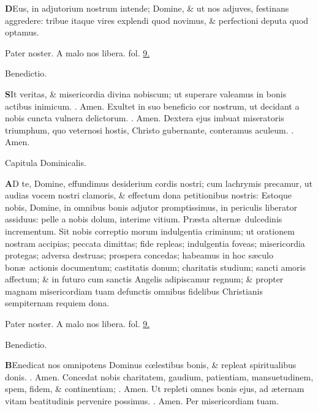 \documentclass[letter,11pt]{book}
\makeatletter
\DeclareRobustCommand{\Rbar}{\vers@resp{0pt}{R}}
\newcommand{\vers@resp@sym}{\raisebox{0.2ex}{\rotatebox[origin=c]{-20}{$\m@th\rceil$}}}
\newcommand{\vers@resp}[2]{%
  {\ooalign{\hidewidth\kern#1\vers@resp@sym\hidewidth\cr#2\cr}}%
}%
\def\R{\color{Red} \Rbar . \color{black}}
\makeatother
\begin{document}
\begin{multicols*}{2}
\lettrine[lines=2]{\bfseries \color{Red} D}{}Eus, in adjutorium nostrum intende; Domine, \& ut nos adjuves, festinans aggredere: tribue itaque vires explendi quod novimus, \& perfectioni deputa quod optamus.
\par Pater noster.
\newline A malo nos libera. \color{Red} fol. \color{black} \hyperlink{page.9}{9.}
\vspace{-.5em} \begin{center} \color{Red} Benedictio. \end{center} \vspace{-.5em}
\lettrine[lines=2]{\bfseries \color{Red} S}{}It veritas, \& misericordia divina nobiscum; ut superare valeamus in bonis actibus inimicum. \R Amen. Exultet in suo beneficio cor nostrum, ut decidant a nobis cuncta vulnera delictorum. \R Amen. Dextera ejus imbuat miseratoris triumphum, quo veternosi hostis, Christo gubernante, conteramus aculeum. \R Amen.
\vspace{-.5em} \begin{center} \color{Red} Capitula Dominicalis. \end{center} \vspace{-.5em}
\lettrine[lines=2]{\bfseries \color{Red} A}{}D te, Domine, effundimus desiderium cordis nostri; cum lachrymis precamur, ut audias vocem nostri clamoris, \& effectum dona petitionibus nostris: Estoque nobis, Domine, in omnibus bonis adjutor promptissimus, in periculis liberator assiduus: pelle a nobis dolum, interime vitium. Pr\ae sta altern\ae \ dulcedinis incrementum. Sit nobis correptio morum indulgentia criminum; ut orationem nostram accipias; peccata dimittas; fide repleas; indulgentia foveas; misericordia protegas; adversa destruas; prospera concedas; habeamus in hoc s\ae culo bon\ae \ actionis documentum; castitatis donum; charitatis studium; sancti amoris affectum; \& in futuro cum sanctis Angelis adipiscamur regnum; \& propter magnam misericordiam tuam defunctis omnibus fidelibus Christianis sempiternam requiem dona.
\par Pater noster.
\newline A malo nos libera. \color{Red} fol. \color{black} \hyperlink{page.9}{9.}
\vspace{-.5em} \begin{center} \color{Red} Benedictio. \end{center} \vspace{-.5em}
\lettrine[lines=2]{\bfseries \color{Red} B}{}Enedicat nos omnipotens Dominus c\oe lestibus bonis, \& repleat spiritualibus donis. \R Amen. Concedat nobis charitatem, gaudium, patientiam, mansuetudinem, spem, fidem, \& continentiam; \R Amen. Ut repleti omnes bonis ejus, ad \ae ternam vitam beatitudinis pervenire possimus. \R Amen. Per misericordiam tuam.

\end{multicols*}
\end{document}
